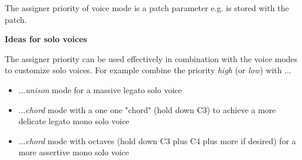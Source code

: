 The assigner priority of voice mode is a patch parameter e.g. is stored with the patch.

\textbf{Ideas for solo voices}

The assigner priority can be used effectively in combination with the voice modes to customize solo voices. For example combine the priority \textit{high} (or \textit{low}) with ...
\begin{itemize}
  \item ...\textit{unison} mode for a massive legato solo voice
  \item ...\textit{chord} mode with a one one "chord" (hold down C3) to achieve a more delicate legato mono solo voice
  \item ...\textit{chord} mode with octaves (hold down C3 plus C4 plus more if desired) for a more assertive mono solo voice   
\end{itemize}

